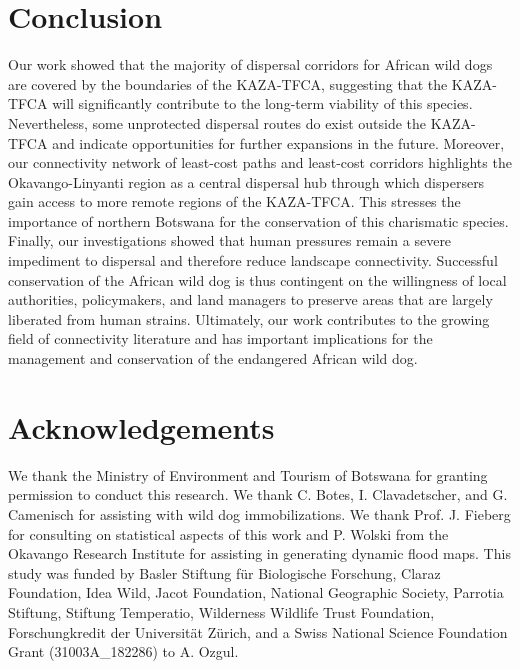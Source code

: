 \documentclass[abstract=on,10pt,a4paper,bibliography=totocnumbered]{article}
\begin{document}

\section{Conclusion}
Our work showed that the majority of dispersal corridors for African wild dogs
are covered by the boundaries of the KAZA-TFCA, suggesting that the KAZA-TFCA
will significantly contribute to the long-term viability of this species.
Nevertheless, some unprotected dispersal routes do exist outside the KAZA-TFCA
and indicate opportunities for further expansions in the future. Moreover, our
connectivity network of least-cost paths and least-cost corridors highlights the
Okavango-Linyanti region as a central dispersal hub through which dispersers
gain access to more remote regions of the KAZA-TFCA. This stresses the
importance of northern Botswana for the conservation of this charismatic
species. Finally, our investigations showed that human pressures remain a severe
impediment to dispersal and therefore reduce landscape connectivity. Successful
conservation of the African wild dog is thus contingent on the willingness of
local authorities, policymakers, and land managers to preserve areas that are
largely liberated from human strains. Ultimately, our work contributes to the
growing field of connectivity literature and has important implications for the
management and conservation of the endangered African wild dog.

\section{Acknowledgements}
We thank the Ministry of Environment and Tourism of Botswana for granting
permission to conduct this research. We thank C. Botes, I. Clavadetscher, and G.
Camenisch for assisting with wild dog immobilizations. We thank Prof. J. Fieberg
for consulting on statistical aspects of this work and P. Wolski from the
Okavango Research Institute for assisting in generating dynamic flood maps. This
study was funded by Basler Stiftung für Biologische Forschung, Claraz
Foundation, Idea Wild, Jacot Foundation, National Geographic Society, Parrotia
Stiftung, Stiftung Temperatio, Wilderness Wildlife Trust Foundation,
Forschungkredit der Universität Zürich, and a Swiss National Science Foundation
Grant (31003A\_182286) to A. Ozgul.

\newpage
\begingroup
\singlespacing

\endgroup
\end{document}
